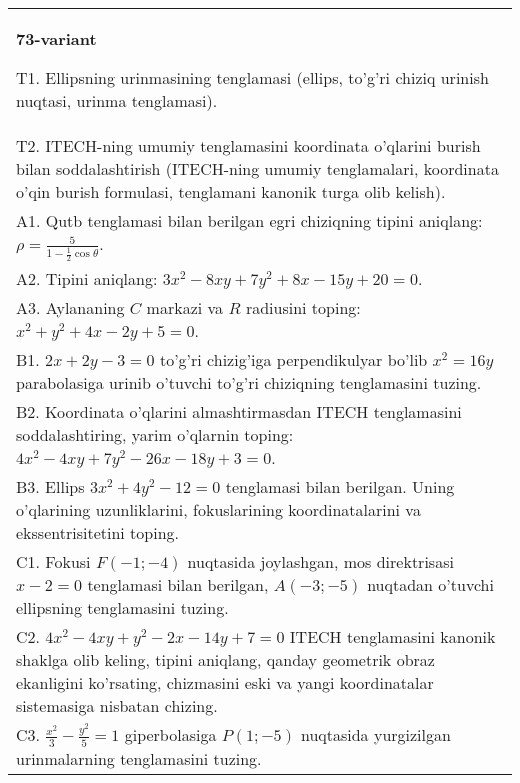 \documentclass{article}
\begin{document}
\begin{tabular}{m{17cm}}
\textbf{73-variant}
\newline

T1. Ellipsning urinmasining tenglamasi (ellips, to'g'ri chiziq urinish nuqtasi, urinma tenglamasi).\\

T2. ITECH-ning umumiy tenglamasini koordinata o'qlarini burish bilan soddalashtirish (ITECH-ning umumiy tenglamalari, koordinata o'qin burish formulasi, tenglamani kanonik turga olib kelish).\\

A1. Qutb tenglamasi bilan berilgan egri chiziqning tipini aniqlang: $\rho=\frac{5}{1-\frac{1}{2}\cos\theta}$.\\

A2. Tipini aniqlang: $3x^{2}-8xy+7y^{2}+8x-15y+20=0$.\\

A3. Aylananing $C$ markazi va $R$ radiusini toping: $x^2+y^2+4x-2y+5=0$.\\

B1. $2x + 2y - 3 = 0$ to'g'ri chizig'iga perpendikulyar bo'lib $x^{2} = 16y$ parabolasiga urinib o'tuvchi to'g'ri chiziqning tenglamasini tuzing.  \\

B2. Koordinata o'qlarini almashtirmasdan ITECH tenglamasini soddalashtiring, yarim o'qlarnin toping: $4x^{2} - 4xy + 7y^{2} - 26x - 18y + 3 = 0$.\\

B3. Ellips $3x^{2} + 4y^{2} - 12 = 0$ tenglamasi bilan berilgan. Uning o'qlarining uzunliklarini, fokuslarining koordinatalarini va ekssentrisitetini toping.  \\

C1. Fokusi $F( - 1; - 4)$ nuqtasida joylashgan, mos direktrisasi $x - 2 = 0$ tenglamasi bilan berilgan, $A( - 3; - 5)$ nuqtadan o'tuvchi ellipsning tenglamasini tuzing.  \\

C2. $4x^{2} - 4xy + y^{2} - 2x - 14y + 7 = 0$ ITECH tenglamasini kanonik shaklga olib keling, tipini aniqlang, qanday geometrik obraz ekanligini ko'rsating, chizmasini eski va yangi koordinatalar sistemasiga nisbatan chizing.  \\

C3. $\frac{x^{2}}{3} - \frac{y^{2}}{5} = 1$ giperbolasiga $P(1; - 5)$ nuqtasida yurgizilgan urinmalarning tenglamasini tuzing.\\

\end{tabular}
\vspace{1cm}
\end{document}
